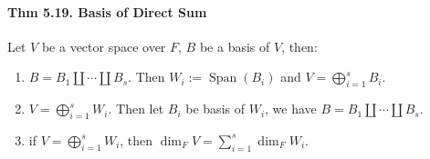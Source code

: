 \paragraph{Thm 5.19. Basis of Direct Sum} Let $V$ be a vector space over $F$, $B$ be a basis of $V$, then:
\begin{enumerate}
    \item $B=B_1\coprod \cdots \coprod B_s$. Then $W_i:=\operatorname{Span}(B_i)$ and $V =\bigoplus_{i=1}^sB_i$.
    \item $V=\bigoplus_{i=1}^sW_i$. Then let $B_i$ be basis of $W_i$, we have $B = B_1\coprod \cdots \coprod B_s$.
    \item if $V=\bigoplus_{i=1}^sW_i$, then $\operatorname{dim}_FV = \sum_{i=1}^s\operatorname{dim}_FW_i$.
\end{enumerate}